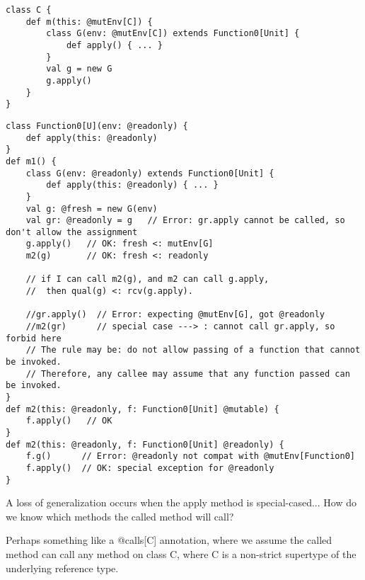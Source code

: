 \begin{lstlisting}[caption={},float={htp},label={lst-}]
class C {
	def m(this: @mutEnv[C]) {
		class G(env: @mutEnv[C]) extends Function0[Unit] {
			def apply() { ... }
		}
		val g = new G
		g.apply()
	}
}
\end{lstlisting}

\begin{lstlisting}[caption={},float={htp},label={lst-}]
class Function0[U](env: @readonly) {
	def apply(this: @readonly)
}
def m1() {
	class G(env: @readonly) extends Function0[Unit] {
		def apply(this: @readonly) { ... }
	}
	val g: @fresh = new G(env)
	val gr: @readonly = g   // Error: gr.apply cannot be called, so don't allow the assignment
	g.apply()   // OK: fresh <: mutEnv[G]
	m2(g)       // OK: fresh <: readonly
	
	// if I can call m2(g), and m2 can call g.apply,
	//  then qual(g) <: rcv(g.apply).
	
	//gr.apply()  // Error: expecting @mutEnv[G], got @readonly
	//m2(gr)      // special case ---> : cannot call gr.apply, so forbid here
	// The rule may be: do not allow passing of a function that cannot be invoked.
	// Therefore, any callee may assume that any function passed can be invoked.
}
def m2(this: @readonly, f: Function0[Unit] @mutable) {
	f.apply()   // OK
}
def m2(this: @readonly, f: Function0[Unit] @readonly) {
	f.g()      // Error: @readonly not compat with @mutEnv[Function0]
	f.apply()  // OK: special exception for @readonly
}
\end{lstlisting}

A loss of generalization occurs when the apply method is special-cased...
How do we know which methods the called method will call?

Perhaps something like a @calls[C] annotation,
where we assume the called method can call any method on class C,
where C is a non-strict supertype of the underlying reference type.
